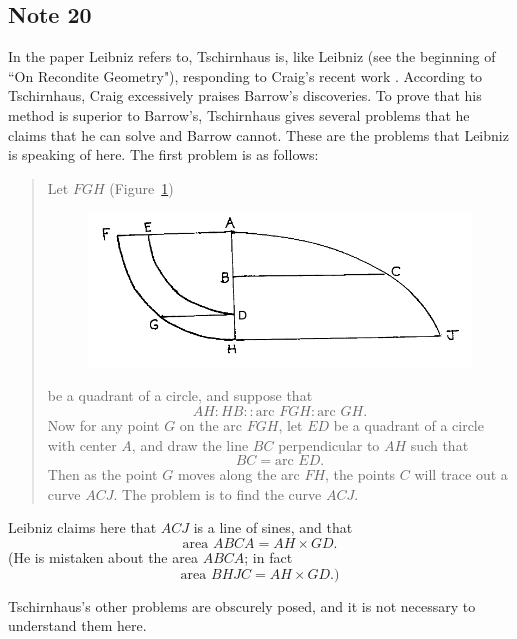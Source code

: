 \documentclass[twoside,openright]{article}
\begin{document}

\subsection*{Note 20}
\label{crg20}

In the paper Leibniz refers to, Tschirnhaus is, like Leibniz (see the
beginning of ``On Recondite Geometry"), responding to Craig's recent
work .  According to Tschirnhaus, Craig excessively praises Barrow's
discoveries. To prove that his method is superior to Barrow's,
Tschirnhaus gives several problems that he claims that he can solve
and Barrow cannot.  These are the problems that Leibniz is speaking of
here.  The first problem is as follows:
\begin{quote}
Let $FGH$ (Figure~\ref{Tschirn1A})
\begin{figure}[htp]
\begin{center}
\includegraphics[width=.75\textwidth]{fig/Figure54a}
\caption{}
\label{Tschirn1A}
\vspace{-10pt}
\end{center}
\end{figure} 
 be a quadrant of a circle, and suppose that
$$AH \!:\! HB :: \mbox{arc }FGH \!:\! \mbox{arc }GH.$$
Now for any point $G$ on the arc $FGH$, let $ED$ be a quadrant of a
circle with center $A$, and draw the line $BC$ perpendicular to $AH$
such that
$$BC = \mbox{arc }ED.$$
Then as the point $G$ moves along the arc $FH$, the points $C$ will
trace out a curve $ACJ$.  The problem is to find the curve $ACJ$.
\end{quote}

 Leibniz claims here that $ACJ$ is a line of sines, and that 
$$\mbox{area }ABCA = AH \times GD.$$
(He is mistaken about the area $ABCA$; in fact
$$\mbox{area }BHJC = AH \times GD.)$$

Tschirnhaus's other problems are obscurely posed, and it is not necessary to understand them here.

\setcounter{footnote}{0}
\setcounter{figure}{0}
\end{document}
